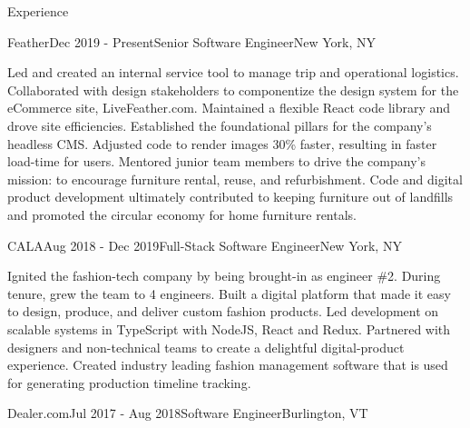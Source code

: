 \documentclass{resume} %
\begin{document}

\begin{rSection}{Experience}


\begin{rSubsection}{Feather}{Dec 2019 - Present}{Senior Software Engineer}{New York, NY}

Led and created an internal service tool to manage trip and operational logistics.
Collaborated with design stakeholders to componentize the design system for the eCommerce
site, LiveFeather.com. Maintained a flexible React code library and drove site efficiencies.
Established the foundational pillars for the company’s headless CMS. Adjusted code to render
images 30\% faster, resulting in faster load-time for users. Mentored junior team members to
drive the company’s mission: to encourage furniture rental, reuse, and refurbishment. Code
and digital product development ultimately contributed to keeping furniture out of landfills
and promoted the circular economy for home furniture rentals.

\end{rSubsection}


\begin{rSubsection}{CALA}{Aug 2018 - Dec 2019}{Full-Stack Software Engineer}{New York, NY}

Ignited the fashion-tech company by being brought-in as engineer \#2. During tenure, grew
the team to 4 engineers. Built a digital platform that made it easy to design, produce,
and deliver custom fashion products. Led development on scalable systems in TypeScript with
NodeJS, React and Redux. Partnered with designers and non-technical teams to create a
delightful digital-product experience. Created industry leading fashion management software
that is used for generating production timeline tracking.

\end{rSubsection}


\begin{rSubsection}{Dealer.com}{Jul 2017 - Aug 2018}{Software Engineer}{Burlington, VT}


\end{rSubsection}
\end{rSection}
\end{document}
